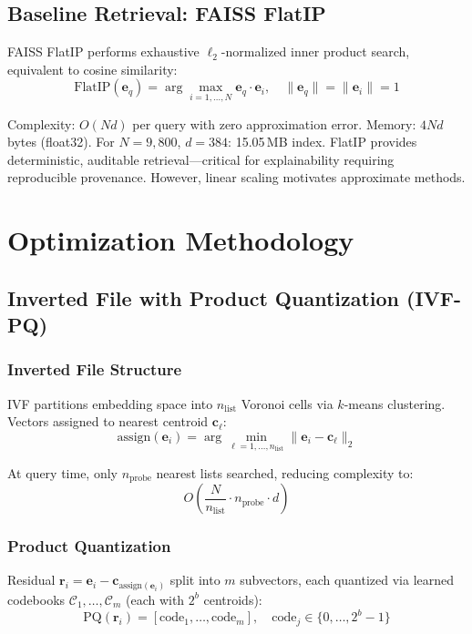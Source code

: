 \documentclass[conference]{IEEEtran}
\begin{document}
\subsection{Baseline Retrieval: FAISS FlatIP}

FAISS FlatIP performs exhaustive $\ell_2$-normalized inner product search, equivalent to cosine similarity:
\begin{equation}
\text{FlatIP}(\mathbf{e}_q) = \arg\max_{i=1,\ldots,N} \mathbf{e}_q \cdot \mathbf{e}_i, \quad \|\mathbf{e}_q\| = \|\mathbf{e}_i\| = 1
\end{equation}

Complexity: $O(Nd)$ per query with zero approximation error. Memory: $4Nd$ bytes (float32). For $N=9{,}800$, $d=384$: 15.05\,MB index. FlatIP provides deterministic, auditable retrieval—critical for explainability requiring reproducible provenance. However, linear scaling motivates approximate methods.

\section{Optimization Methodology}

\subsection{Inverted File with Product Quantization (IVF-PQ)}

\subsubsection{Inverted File Structure}
IVF partitions embedding space into $n_{\text{list}}$ Voronoi cells via $k$-means clustering. Vectors assigned to nearest centroid $\mathbf{c}_\ell$:
\begin{equation}
\text{assign}(\mathbf{e}_i) = \arg\min_{\ell=1,\ldots,n_{\text{list}}} \|\mathbf{e}_i - \mathbf{c}_\ell\|_2
\end{equation}

At query time, only $n_{\text{probe}}$ nearest lists searched, reducing complexity to:
\begin{equation}
O\left(\frac{N}{n_{\text{list}}} \cdot n_{\text{probe}} \cdot d\right)
\end{equation}

\subsubsection{Product Quantization}
Residual $\mathbf{r}_i = \mathbf{e}_i - \mathbf{c}_{\text{assign}(\mathbf{e}_i)}$ split into $m$ subvectors, each quantized via learned codebooks $\mathcal{C}_1, \ldots, \mathcal{C}_m$ (each with $2^b$ centroids):
\begin{equation}
\text{PQ}(\mathbf{r}_i) = [\text{code}_1, \ldots, \text{code}_m], \quad \text{code}_j \in \{0, \ldots, 2^b-1\}
\end{equation}
\end{document}
